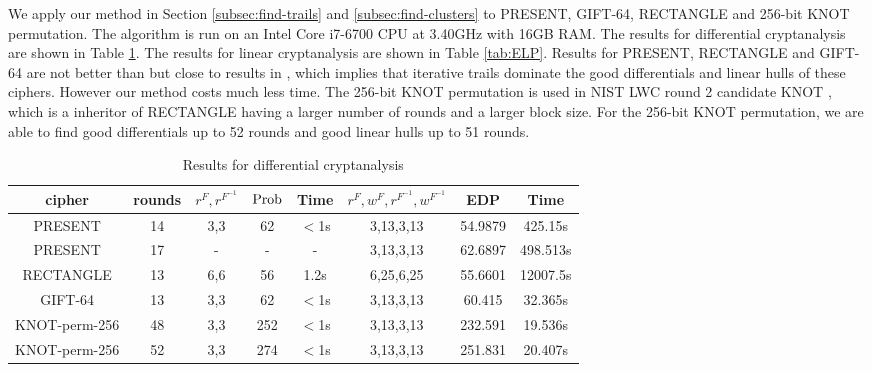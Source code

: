 We apply our method in Section \ref{subsec:find-trails} and \ref{subsec:find-clusters} to PRESENT, GIFT-64, RECTANGLE and 256-bit KNOT permutation. The algorithm is run on an Intel Core i7-6700 CPU at 3.40GHz with 16GB RAM. The results for differential cryptanalysis are shown in Table \ref{tab:EDP}. The results for linear cryptanalysis are shown in Table \ref{tab:ELP}. Results for PRESENT, RECTANGLE and GIFT-64 are not better than but close to results in \cite{HV18}, which implies that iterative trails dominate the good differentials and linear hulls of these ciphers. However our method costs much less time. The 256-bit KNOT permutation is used in NIST LWC round 2 candidate KNOT \cite{ZDY19}, which is a inheritor of RECTANGLE having a larger number of rounds and a larger block size. For the 256-bit KNOT permutation, we are able to find good differentials up to 52 rounds and good linear hulls up to 51 rounds. 

\begin{table}
	\caption{Results for differential cryptanalysis}\label{tab:EDP}
	\centering
	\begin{tabular}{|c|c|c|c|c|c|c|c|}
		\hline
		cipher & rounds & $r^F,r^{F^{-1}}$ & $\text{Prob}$ & Time & $r^F,w^F,r^{F^{-1}},w^{F^{-1}}$ & EDP & Time \\
		\hline
		PRESENT & 14 & 3,3 & 62 & $<$1s & 3,13,3,13 & 54.9879 & 425.15s \\
		\hline 
		PRESENT & 17 & - & - & - & 3,13,3,13 & 62.6897 & 498.513s\\
		\hline 
		RECTANGLE & 13 & 6,6 & 56 & 1.2s & 6,25,6,25 & 55.6601 & 12007.5s \\
		\hline
		GIFT-64 & 13 & 3,3 & 62 & $<$1s & 3,13,3,13 & 60.415 & 32.365s\\
		\hline
		KNOT-perm-256 & 48 & 3,3 & 252 & $<$1s & 3,13,3,13 & 232.591 & 19.536s\\
		\hline
		KNOT-perm-256 & 52 & 3,3 & 274 & $<$1s & 3,13,3,13 & 251.831 & 20.407s\\
		\hline
	\end{tabular}
\end{table}

